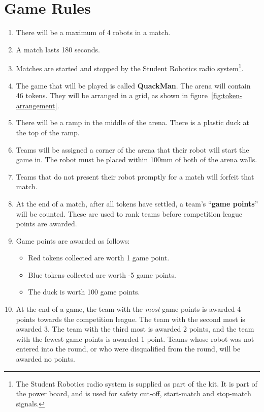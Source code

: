 \section {Game Rules}
\label{game-rules}

\begin{enumerate}
\item There will be a maximum of 4 robots in a match.
\item A match lasts 180 seconds.
\item Matches are started and stopped by the Student Robotics radio system\footnote{The Student Robotics radio system is supplied as part of the kit.
 It is part of the power board, and is used for safety cut-off, start-match and stop-match signals.}.
\item The game that will be played is called \textbf{QuackMan}.  The arena will contain 46 tokens.  They will be arranged in a grid, as shown in figure~\ref{fig:token-arrangement}.
\item There will be a ramp in the middle of the arena.  There is a plastic duck at the top of the ramp.
\item Teams will be assigned a corner of the arena that their robot will start the game in.  The robot must be placed within 100mm of both of the arena walls.
\item Teams that do not present their robot promptly for a match will forfeit that match.
\item At the end of a match, after all tokens have settled, a team's ``\textbf{game points}'' will be counted.
 These are used to rank teams before competition league points are awarded.

\item Game points are awarded as follows:
\begin{itemize}
\item Red tokens collected are worth 1 game point.
\item Blue tokens collected are worth -5 game points.
\item The duck is worth 100 game points.
\end{itemize}

\item At the end of a game, the team with the \emph{most} game points is awarded 4 points towards the competition league.
 The team with the second most is awarded 3.
 The team with the third most is awarded 2 points, and the team with the fewest game points is awarded 1 point.
 Teams whose robot was not entered into the round, or who were disqualified from the round, will be awarded no points.
\end{enumerate}

